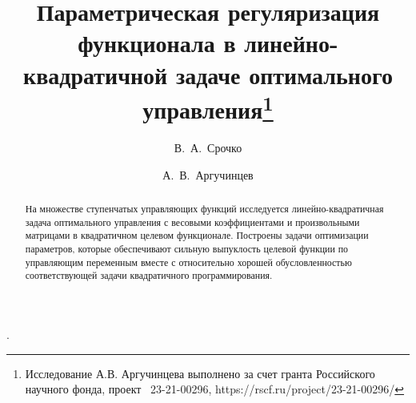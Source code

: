 \usepackage{todonotes} %

\usepackage[russian]{nla}


\fi

\title{Параметрическая регуляризация функционала в линейно-квадратичной задаче оптимального
 управления\thanks{Исследование А.В. Аргучинцева выполнено за счет гранта Российского научного фонда, проект \textnumero~23-21-00296, https://rscf.ru/project/23-21-00296/}}.

\author{В.~А.~Срочко  %
  \and  %
  А.~В.~Аргучинцев
  } %


\maketitle

\begin{abstract}
На множестве ступенчатых управляющих функций исследуется ли\-ней\-но-квадратичная задача оптимального управления с весовыми коэффициентами и произвольными матрицами в квадратичном целевом функционале. Построены задачи оптимизации параметров, которые обеспечивают сильную выпуклость целевой функции по управляющим переменным вместе с относительно хорошей обусловленностью соответствующей задачи квадратичного программирования.

\end{abstract}

